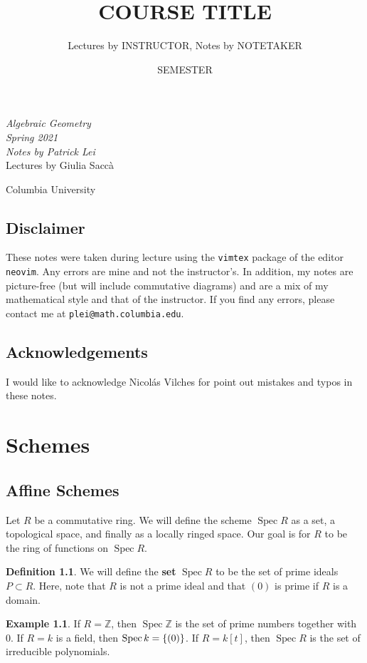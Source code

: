 \documentclass[leqno, openany]{memoir}
\title{COURSE TITLE}
\author{Lectures by INSTRUCTOR, Notes by NOTETAKER}
\date{SEMESTER}
\theoremstyle{definition}
\newtheorem{defn}[thm]{Definition}
\newtheorem{exm}[thm]{Example}
\theoremstyle{remark}
\theoremstyle{plain}
\theoremstyle{definition}
\theoremstyle{remark}
\newcommand{\Z}{\mathbb{Z}}
\DeclareMathOperator{\Spec}{Spec}
\newcommand*{\titleSW}
    {\begingroup%
    \raggedleft
    \vspace*{\baselineskip}
    {\Huge\itshape Algebraic Geometry \\ Spring 2021}\\[\baselineskip]
    {\large\itshape Notes by Patrick Lei}\\[0.2\textheight]
    {\Large Lectures by Giulia Sacc\`a}\par
    \vfill
    {\Large \sffamily Columbia University}
    \vspace*{\baselineskip}
\endgroup}
\begin{document}
    
\begin{titlingpage}
\titleSW
\end{titlingpage}

\thispagestyle{empty}
\section*{Disclaimer}%
\label{sec:disclaimer}

These notes were taken during lecture using the \texttt{vimtex} package of the editor \texttt{neovim}. 
Any errors are mine and not the instructor's. 
In addition, my notes are picture-free (but will include commutative diagrams) and are a mix of my mathematical style and that of the instructor.
If you find any errors, please contact me at \texttt{plei@math.columbia.edu}.

\section*{Acknowledgements}%
\label{sec:acknowledgements}

I would like to acknowledge Nicol\'as Vilches for point out mistakes and typos in these notes.

\newpage

\tableofcontents

\chapter{Schemes}%
\label{cha:schemes}

\section{Affine Schemes}%
\label{sec:affine_schemes}

Let $R$ be a commutative ring. We will define the scheme $\Spec R$ as a set, a topological space, and finally as a locally ringed space. Our goal is for $R$ to be the ring of functions on $\Spec R$.

\begin{defn}
    We will define the \textbf{set} $\Spec R$ to be the set of prime ideals $P \subset R$. Here, note that $R$ is not a prime ideal and that $(0)$ is prime if $R$ is a domain. 
\end{defn}

\begin{exm}
    If $R = \Z$, then $\Spec \Z$ is the set of prime numbers together with $0$. If $R = k$ is a field, then $\Spec k = \qty{(0)}$. If $R = k[t]$, then $\Spec R$ is the set of irreducible polynomials.
\end{exm}
\end{document}
